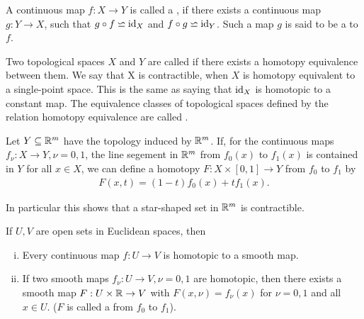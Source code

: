 \begin{definition}\label{definition:6-4}
  A continuous map $f:X\to Y$ is called a , if
there exists a continuous map $g:Y\to X$, such that $g\circ f \backsimeq \operatorname{id}_X$ and $f\circ g\backsimeq \operatorname{id}_Y$.
Such a map $g$ is said to be a  to $f$.
\end{definition}

Two topological spaces $X$ and $Y$ are called  if there exists a
homotopy equivalence between them. We say that X is contractible, when $X$ is
homotopy equivalent to a single-point space. This is the same as saying that $\operatorname{id}_X$
is homotopic to a constant map. The equivalence classes of topological spaces
defined by the relation homotopy equivalence are called .

\begin{example}\label{example:6-5}
Let $Y\subseteq{\ensuremath{\mathbb{R}}}^m$ have the topology induced by ${\mathbb{R}}^m$. If, for the continuous maps $f_\nu:X\to Y, \nu=0, 1$, the line segement
in ${\mathbb{R}}^m$ from $f_0(x)$ to $f_1(x)$ is contained in $Y$ for all $x\in X$, we can define a homotopy $F:X\times [0, 1]\to Y$  from 
$f_0$ to $f_1$ by 
\begin{align*}
  F(x, t) = (1-t)f_0(x) + tf_1(x).
\end{align*}

In particular this shows that a star-shaped set in ${\mathbb{R}}^m$ is contractible.
\end{example}


\begin{lemma}\label{lemma:6-6}
If $U, V$ are open sets in Euclidean spaces, then 
\begin{enumerate}[(i)]
  \item Every continuous map $f:U\to V$ is homotopic to a smooth map.
  \item If two smooth maps $f_\nu:U\to V, \nu=0, 1$ are homotopic, then there exists a smooth map $F:U\times{\ensuremath{\mathbb{R}}}\to V$ with 
    $F(x, \nu) = f_\nu(x)$ for $\nu=0, 1$ and all $x\in U$. ($F$  is called a  from $f_0$ to $f_1$).
\end{enumerate}
\end{lemma}

